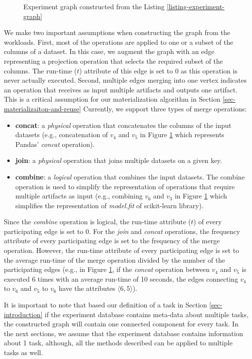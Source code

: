\begin{figure}
\centering

\caption{Experiment graph constructed from the Listing \ref{listing-experiment-graph}}
\label{fig-experiment-graph}
\end{figure}

We make two important assumptions when constructing the graph from the workloads.
First, most of the operations are applied to one or a subset of the columns of a dataset.
In this case, we augment the graph with an edge representing a projection operation that selects the required subset of the columns.
The run-time ($t$) attribute of this edge is set to 0 as this operation is never actually executed.
Second, multiple edges merging into one vertex indicates an operation that receives as input multiple artifacts and outputs one artifact.
This is a critical assumption for our materialization algorithm in Section \ref{sec-materializaiton-and-reuse}
Currently, we support three types of merge operations:
\begin{itemize}
\item \textbf{concat}: a \textit{physical} operation that concatenates the columns of the input datasets (e.g., concatenation of $v_4$ and $v_5$ in Figure \ref{fig-experiment-graph} which represents Pandas' \textit{concat} operation).
\item \textbf{join}: a \textit{physical} operation that joins multiple datasets on a given key.
\item \textbf{combine}: a \textit{logical} operation that combines the input datasets. The combine operation is used to simplify the representation of operations that require multiple artifacts as input (e.g., combining $v_6$ and $v_3$ in Figure \ref{fig-experiment-graph} which simplifies the representation of \textit{model.fit} of scikit-learn library).
\end{itemize}
Since the \textit{combine} operation is logical, the run-time attribute ($t$) of every participating edge is set to $0$.
For the \textit{join} and \textit{concat} operations, the frequency attribute of every participating edge is set to the frequency of the merge operation.
However, the run-time attribute of every participating edge is set to the average run-time of the merge operation divided by the number of the participating edges (e.g., in Figure \ref{fig-experiment-graph}, if the \textit{concat} operation between $v_4$ and $v_5$ is executed 6 times with an average run-time of 10 seconds, the edges connecting $v_4$ to $v_6$ and $v_5$ to $v_6$ have the attributes $\langle6, 5\rangle$).

It is important to note that based our definition of a task in Section \ref{sec-introduction} if the experiment database contains meta-data about multiple tasks, the constructed graph will contain one connected component for every task.
In the next sections, we assume that the experiment database contains information about 1 task, although, all the methods described can be applied to multiple tasks as well.